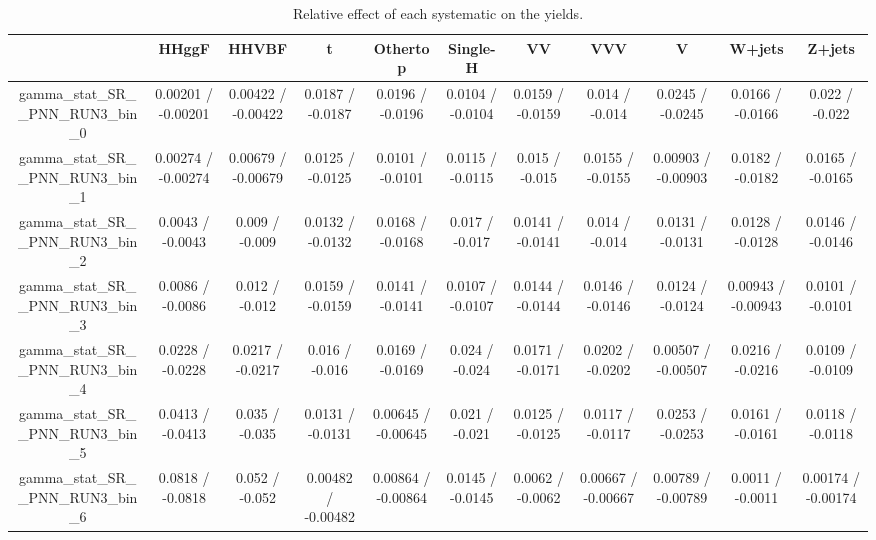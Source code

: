 \documentclass[10pt]{article}
\begin{document}
\begin{table}[htbp]
\begin{center}
\begin{tabular}{|c|c|c|c|c|c|c|c|c|c|c|}
\hline 
      & HHggF      & HHVBF      & t      & Othertop      & Single-H      & VV      & VVV      & V      & W+jets      & Z+jets \\ 
\hline 
  gamma_stat_SR__PNN_RUN3_bin_0 & 0.00201 / -0.00201 & 0.00422 / -0.00422 & 0.0187 / -0.0187 & 0.0196 / -0.0196 & 0.0104 / -0.0104 & 0.0159 / -0.0159 & 0.014 / -0.014 & 0.0245 / -0.0245 & 0.0166 / -0.0166 & 0.022 / -0.022 \\ 
  gamma_stat_SR__PNN_RUN3_bin_1 & 0.00274 / -0.00274 & 0.00679 / -0.00679 & 0.0125 / -0.0125 & 0.0101 / -0.0101 & 0.0115 / -0.0115 & 0.015 / -0.015 & 0.0155 / -0.0155 & 0.00903 / -0.00903 & 0.0182 / -0.0182 & 0.0165 / -0.0165 \\ 
  gamma_stat_SR__PNN_RUN3_bin_2 & 0.0043 / -0.0043 & 0.009 / -0.009 & 0.0132 / -0.0132 & 0.0168 / -0.0168 & 0.017 / -0.017 & 0.0141 / -0.0141 & 0.014 / -0.014 & 0.0131 / -0.0131 & 0.0128 / -0.0128 & 0.0146 / -0.0146 \\ 
  gamma_stat_SR__PNN_RUN3_bin_3 & 0.0086 / -0.0086 & 0.012 / -0.012 & 0.0159 / -0.0159 & 0.0141 / -0.0141 & 0.0107 / -0.0107 & 0.0144 / -0.0144 & 0.0146 / -0.0146 & 0.0124 / -0.0124 & 0.00943 / -0.00943 & 0.0101 / -0.0101 \\ 
  gamma_stat_SR__PNN_RUN3_bin_4 & 0.0228 / -0.0228 & 0.0217 / -0.0217 & 0.016 / -0.016 & 0.0169 / -0.0169 & 0.024 / -0.024 & 0.0171 / -0.0171 & 0.0202 / -0.0202 & 0.00507 / -0.00507 & 0.0216 / -0.0216 & 0.0109 / -0.0109 \\ 
  gamma_stat_SR__PNN_RUN3_bin_5 & 0.0413 / -0.0413 & 0.035 / -0.035 & 0.0131 / -0.0131 & 0.00645 / -0.00645 & 0.021 / -0.021 & 0.0125 / -0.0125 & 0.0117 / -0.0117 & 0.0253 / -0.0253 & 0.0161 / -0.0161 & 0.0118 / -0.0118 \\ 
  gamma_stat_SR__PNN_RUN3_bin_6 & 0.0818 / -0.0818 & 0.052 / -0.052 & 0.00482 / -0.00482 & 0.00864 / -0.00864 & 0.0145 / -0.0145 & 0.0062 / -0.0062 & 0.00667 / -0.00667 & 0.00789 / -0.00789 & 0.0011 / -0.0011 & 0.00174 / -0.00174 \\ 
\hline 
\end{tabular} 
\caption{Relative effect of each systematic on the yields.} 
\end{center} 
\end{table} 
\end{document}
